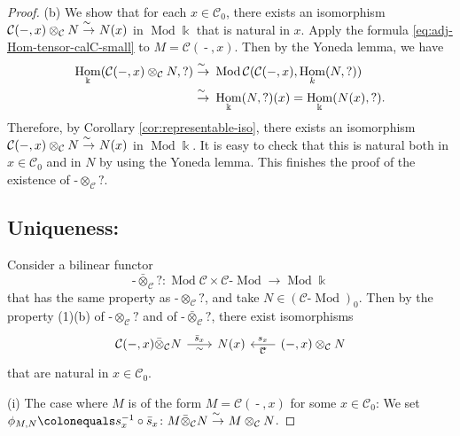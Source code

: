 \documentclass{surv-l}
\numberwithin{equation}{chapter}
\numberwithin{figure}{chapter}
\theoremstyle{plain}
\theoremstyle{definition}
\theoremstyle{remark}
\newcommand{\isoto}{\
  \raise.8ex\hbox{$^{\sim}$}\kern-.7em\hbox{$\to$}\ }
\newcommand{\lMod}{\text{-}\!\Mod}
\DeclareMathOperator{\Hom}{Hom}
\DeclareMathOperator{\Mod}{Mod}
\DeclareMathOperator{\blank}{-}
\begin{document}
\begin{proof}
(b) We show that for each $x \in {\mathcal{C}}_0$,
there exists an isomorphism ${\mathcal{C}}(\blank, x) \otimes_{\mathcal{C}} N \isoto N(x)$
in $\Mod\Bbbk$ that is natural in $x$.
Apply the formula \eqref{eq:adj-Hom-tensor-calC-small} to $M = {\mathcal{C}}(\blank, x)$.
Then by the Yoneda lemma, we have
\begin{equation}\label{eq:Yoneda-tensor}
\begin{aligned}
\Hom_\Bbbk({\mathcal{C}}(\blank, x)\otimes_{\mathcal{C}} N, ?) &\isoto \Mod{\mathcal{C}} ({\mathcal{C}}(\blank, x),\Hom_k(N, ?))\\
&\isoto \Hom_\Bbbk(N,?)(x) = \Hom_\Bbbk(N(x), ?).
\end{aligned}
\end{equation}
Therefore, by Corollary \ref{cor:representable-iso}, there exists an isomorphism
${\mathcal{C}}(\blank, x) \otimes_{\mathcal{C}} N \isoto N(x)$ in $\Mod\Bbbk$.
It is easy to check that this is natural both in $x \in {\mathcal{C}}_0$ and in $N$
by using the Yoneda lemma.
This finishes the proof of the existence of $\blank \otimes_{\mathcal{C}} ?$.


\subsection*{Uniqueness:}
Consider a bilinear functor
\[
\blank \bar{\otimes}_{\mathcal{C}} ?  \colon \Mod {\mathcal{C}} \times {\mathcal{C}}\lMod \to \Mod \Bbbk
\]
that has the same property as $\blank \otimes_{\mathcal{C}} ?$, and take $N \in ({\mathcal{C}}\lMod)_0$.
Then by the property (1)(b) of $\blank \otimes_{\mathcal{C}} ?$ and of $\blank \bar{\otimes}_{\mathcal{C}} ?$,
there exist isomorphisms
\[
\begin{tikzcd}[row sep=4em, column sep=2em]
{\mathcal{C}}(\blank, x) \bar{\otimes}_{\mathcal{C}} N  \rar["\bar{s}_x", "\sim" '] & N(x) &\lar["s_x" ', "\sim"]
{\mathcal{C}}(\blank, x) \otimes_{\mathcal{C}} N
\end{tikzcd}
\]
that are natural in $x \in {\mathcal{C}}_0$.

(i) The case where $M$ is of the form $M = {\mathcal{C}}(\blank, x)$ for some $x \in {\mathcal{C}}_0$:
We set
$\phi_{M, N}\colonequals  s_x^{-1} \circ \bar{s}_x \colon M \bar\otimes_{\mathcal{C}} N \isoto M \otimes_{\mathcal{C}} N$.


\end{proof}
\end{document}
